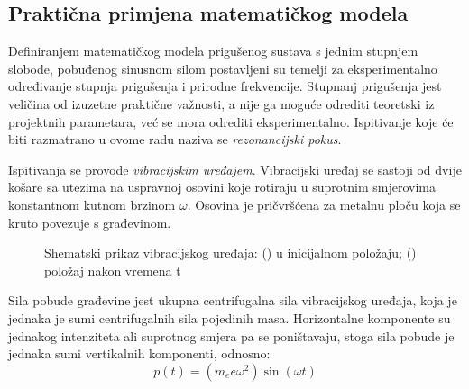 \subsection{Praktična primjena matematičkog modela}
Definiranjem matematičkog modela prigušenog sustava s jednim stupnjem slobode,
pobuđenog sinusnom silom postavljeni su temelji za eksperimentalno određivanje
stupnja prigušenja i prirodne frekvencije. Stupnanj prigušenja jest veličina od
izuzetne praktične važnosti, a nije ga moguće odrediti teoretski iz projektnih
parametara, već se mora odrediti eksperimentalno. %
Ispitivanje koje će biti razmatrano u ovome radu naziva se \textit{rezonancijski
pokus}.


Ispitivanja se provode \textit{vibracijskim uređajem}. Vibracijski uređaj se sastoji
od dvije košare sa utezima na uspravnoj osovini koje rotiraju u suprotnim smjerovima
konstantnom kutnom brzinom $\omega$. Osovina je pričvršćena za metalnu ploču koja se
kruto povezuje s građevinom. 

\begin{figure}[H]
        \begin{subfigure}[b][][r]{0.45\textwidth}
        
        \caption{}
        \label{fig:vibracijski-t0}
    \end{subfigure}
    \begin{subfigure}[b][][l]{0.45\textwidth}
        
        \caption{}
        \label{fig:vibracijski-t}
    \end{subfigure}
    \caption{Shematski prikaz vibracijskog uređaja: 
            () u inicijalnom položaju;
            () položaj nakon vremena t}
    \label{fig:vibracijski}
\end{figure}

Sila pobude građevine jest ukupna centrifugalna sila vibracijskog uređaja, koja je 
jednaka je sumi centrifugalnih sila pojedinih masa.
Horizontalne komponente su jednakog intenziteta ali suprotnog smjera pa se
poništavaju, stoga sila pobude je jednaka sumi vertikalnih komponenti, odnosno:
\begin{equation}
    p(t)=(m_ee\omega^2)\sin(\omega t)
\end{equation}


